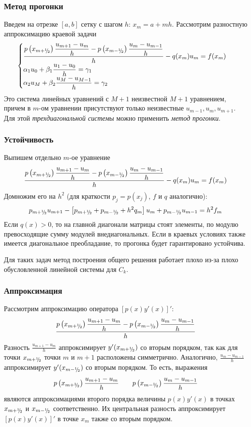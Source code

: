 \documentclass[professionalfonts,compress,unicode,aspectratio=169]{beamer}
\newcommand{\cutefrac}[2]{{}^{#1}\mkern-5mu/{\!}_#2}
\newcommand{\half}{{\cutefrac{1}{2}}}
\begin{document}
\begin{frame}\frametitle{Метод прогонки}
	Введем на отрезке $[a,b]$ сетку с шагом $h$: $x_m = a + mh$. Рассмотрим разностную аппроксимацию краевой задачи
	\[\begin{cases}
		\dfrac{p\left(x_{m+\half}\right)\dfrac{u_{m+1}-u_m}{h}-p\left(x_{m-\half}\right)\dfrac{u_m-u_{m-1}}{h}}{h}
		-q(x_m) u_m = f(x_m)\\
		\alpha_1 u_0 + \beta_1 \dfrac{u_1 - u_0}{h} = \gamma_1\\
		\alpha_2 u_M + \beta_2 \dfrac{u_M - u_{M-1}}{h} = \gamma_2
	\end{cases}\]
	Это система линейных уравнений с $M+1$ неизвестной $M+1$ уравнением, причем в $m$-ом уравнении присутствуют только неизвестные 
	$u_{m-1},u_m,u_{m+1}$. Для этой \emph{трехдиагональной системы} можно применить
	\emph{метод прогонки}.
\end{frame}

\begin{frame}\frametitle{Устойчивость}
	Выпишем отдельно $m$-ое уравнение
	\[
		\dfrac{p\left(x_{m+\half}\right)\dfrac{u_{m+1}-u_m}{h}-p\left(x_{m-\half}\right)\dfrac{u_m-u_{m-1}}{h}}{h}
		-q(x_m) u_m = f(x_m)
	\]
	Домножим его на $h^2$ (для краткости $p_j = p(x_j)$, $f$ и $q$ аналогично):
	\[
		p_{m+\half}u_{m+1}
		-\left[
		p_{m+\half} +
		p_{m-\half} +
		h^2q_m\right]u_m
		+ p_{m-\half}u_{m-1}
		= h^2f_m
	\]
	Если $q(x) > 0$, то на главной диагонали матрицы стоят элементы, по модулю превосходящие сумму модулей внедиагональных.
	Если в краевых условиях также имеется диагональное преобладание, то прогонка
	будет гарантировано устойчива.

	Для таких задач метод построения общего решения работает плохо из-за
	плохо обусловленной линейной системы для $C_k$.
\end{frame}

\begin{frame}\frametitle{Аппроксимация}
	Рассмотрим аппроксимацию оператора $[p(x)y'(x)]'$:
	\[
		\dfrac{p\left(x_{m+\half}\right)\dfrac{u_{m+1}-u_m}{h}-p\left(x_{m-\half}\right)\dfrac{u_m-u_{m-1}}{h}}{h}
	\]
	Разность $\frac{u_{m+1} - u_m}{h}$ аппроксимирует $y'(x_{m+\half})$ со
	вторым порядком, так как для точки $x_{m+\half}$ точки $m$ и $m + 1$
	расположены симметрично. Аналогично, $\frac{u_m - u_{m-1}}{h}$
	аппроксимирует $y'(x_{m - \half})$ со вторым порядком. То есть, выражения
	\[
	p\left(x_{m+\half}\right)\dfrac{u_{m+1}-u_m}{h} \qquad
	p\left(x_{m-\half}\right)\dfrac{u_m-u_{m-1}}{h}
	\]
	являются аппроксимациями второго порядка величины $p(x)y'(x)$ в точках
	$x_{m+\half}$ и $x_{m - \half}$ соответственно. Их центральная разность
	аппроксимирует $[p(x)y'(x)]'$ в точке $x_m$ также со вторым порядком.
\end{frame}
\end{document}
